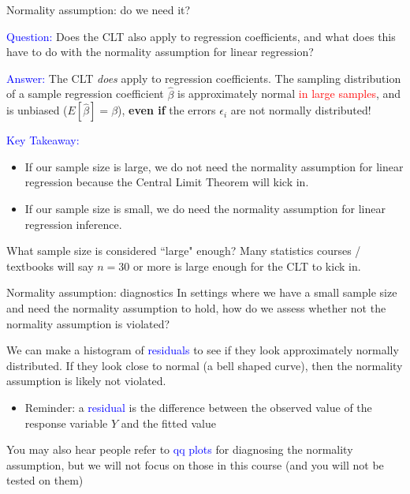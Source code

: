 \documentclass[10pt,t]{beamer}
\begin{document}
\begin{frame}{Normality assumption: do we need it?}

\textcolor{blue}{Question:} Does the CLT also apply to regression coefficients, and what does this have to do with the normality assumption for linear regression?

\vspace{0.3cm} 

\textcolor{blue}{Answer:} The CLT \textit{does} apply to regression coefficients. The sampling distribution of a sample regression coefficient $\hat{\beta}$ is approximately normal \textcolor{red}{in large samples}, and is unbiased ($E[\hat{\beta}] = \beta$), \textbf{even if} the errors $\epsilon_i$ are not normally distributed! \pause

\vspace{0.3cm} 

\textcolor{blue}{Key Takeaway:} 
\begin{itemize}
	\item If our sample size is large, we do not need the normality assumption for linear regression because the Central Limit Theorem will kick in.
	\item If our sample size is small, we do need the normality assumption for linear regression inference.
\end{itemize}

\small What sample size is considered ``large" enough? Many statistics courses / textbooks will say $n = 30$ or more is large enough for the CLT to kick in. 

\end{frame}

\begin{frame}{Normality assumption: diagnostics}
In settings where we have a small sample size and need the normality assumption to hold, how do we assess whether not the normality assumption is violated?

\vspace{0.3cm}

We can make a histogram of \textcolor{blue}{residuals} to see if they look approximately normally distributed. If they look close to normal (a bell shaped curve), then the normality assumption is likely not violated.

\vspace{0.3cm}

\begin{itemize}
	\item[] Reminder: a \textcolor{blue}{residual} is the difference between the observed value of the response variable $Y$ and the fitted value 
\end{itemize}

\vspace{0.3cm}

\small You may also hear people refer to \textcolor{blue}{qq plots} for diagnosing the normality assumption, but we will not focus on those in this course (and you will not be tested on them)

\end{frame}
\end{document}
